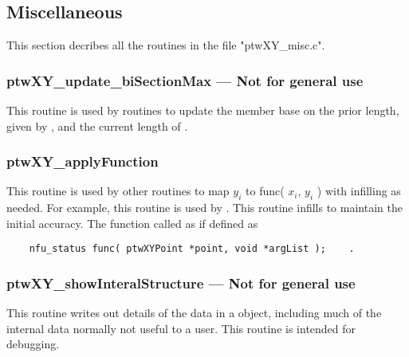 \subsection{Miscellaneous}
This section decribes all the routines in the file "ptwXY\_misc.c".

\subsubsection{ptwXY\_update\_biSectionMax --- Not for general use}
This routine is used by  routines to update the member  base on the prior length, given
by , and the current length of .

\subsubsection{ptwXY\_applyFunction}
This routine is used by other routines to map $y_i$ to func( $x_i$, $y_i$ ) with infilling as needed. For example,
this routine is used by .
This routine infills to maintain the initial accuracy. The function  called as if defined as 
\begin{verbatim}
    nfu_status func( ptwXYPoint *point, void *argList );    .
\end{verbatim}

\subsubsection{ptwXY\_showInteralStructure --- Not for general use}
This routine writes out details of the data in a  object, including much of the
internal data normally not useful to a user. This routine is intended for debugging.

